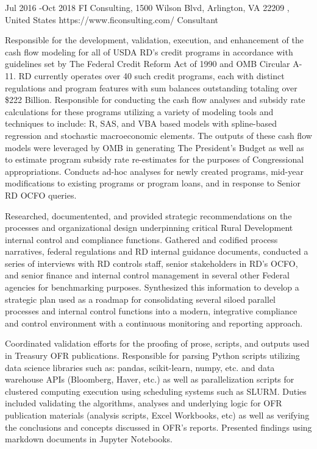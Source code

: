 \documentclass[10pt]{article} %
\begin{document}
\job
{Jul 2016 -}{Oct 2018}
{FI Consulting, 1500 Wilson Blvd, Arlington, VA 22209 , United States}
{https://www.ficonsulting.com/}
{Consultant}
{Responsible for the development, validation, execution, and enhancement of the cash flow modeling for all of USDA RD’s credit programs in accordance with guidelines set by The Federal Credit Reform Act of 1990 and OMB Circular A-11. RD currently operates over 40 such credit programs, each with distinct regulations and program features with sum balances outstanding totaling over \$222 Billion. Responsible for conducting the cash flow analyses and subsidy rate calculations for these programs utilizing a variety of modeling tools and techniques to include:  R, SAS, and VBA based models with spline-based regression and stochastic macroeconomic elements. The outputs of these cash flow models were leveraged by OMB in generating The President’s Budget as well as to estimate program subsidy rate re-estimates for the purposes of Congressional appropriations. Conducts ad-hoc analyses for newly created programs, mid-year modifications to existing programs or program loans, and in response to Senior RD OCFO queries.

Researched, documentented, and provided strategic recommendations on the processes and organizational design underpinning critical Rural Development internal control and compliance functions. Gathered and codified process narratives, federal regulations and RD internal guidance documents, conducted a series of interviews with RD controls staff, senior stakeholders in RD’s OCFO, and senior finance and internal control management in several other Federal agencies for benchmarking purposes. Synthesized this information to develop a strategic plan used as a roadmap for consolidating several siloed parallel processes and internal control functions into a modern, integrative compliance and control environment with a continuous monitoring and reporting approach.

Coordinated validation efforts for the proofing of prose, scripts, and outputs used in Treasury OFR publications. Responsible for parsing Python scripts utilizing data science libraries such as: pandas, scikit-learn, numpy, etc. and data warehouse APIs (Bloomberg, Haver, etc.) as well as parallelization scripts for clustered computing execution using scheduling systems such as SLURM. Duties included validating the algorithms, analyses and underlying logic for OFR publication materials (analysis scripts, Excel Workbooks, etc) as well as verifying the conclusions and concepts discussed in OFR’s reports. Presented findings using markdown documents in Jupyter Notebooks.

}
\end{document}
